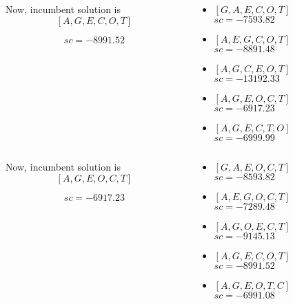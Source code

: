 \begin{frame}[fragile]
	\begin{columns}
		\begin{column}{.5\linewidth}
			Now, incumbent solution is
				\[ [ A , G , E , C , O , T ] \]
			\begin{figure}
				\centering
				
			\end{figure}
			\[ {sc} = -8991.52 \]
		\end{column}
		\begin{column}{.4\linewidth}
			\begin{itemize}
				\item $[ G , A , E , C , O , T ]$\\$sc = -7593.82$
				\item $[ A , E , G , C , O , T ]$\\$sc = -8891.48$
				\item $[ A , G , C , E , O , T ]$\\$sc = -13192.33$
				\item \alert{$[ A , G , E , O , C , T ]$\\$sc = -6917.23$}
				\item $[ A , G , E , C , T , O ]$\\$sc = -6999.99$
			\end{itemize}
		\end{column}
	\end{columns}
\end{frame}
	
\begin{frame}[fragile]
	\begin{columns}
		\begin{column}{.5\linewidth}
			Now, incumbent solution is
				\[ [ A , G , E , O , C , T ] \]
			\begin{figure}
				\centering
				
			\end{figure}
			\[ {sc} = -6917.23 \]
		\end{column}
		\begin{column}{.4\linewidth}
			\begin{itemize}
				\item $[ G , A , E , O , C , T ]$\\$sc = -8593.82$
				\item $[ A , E , G , O , C , T ]$\\$sc = -7289.48$
				\item $[ A , G , O , E , C , T ]$\\$sc = -9145.13$
				\item $[ A , G , E , C , O , T ]$\\$sc = -8991.52$
				\item $[ A , G , E , O , T , C ]$\\$sc = -6991.08$
			\end{itemize}
		\end{column}
	\end{columns}
\end{frame}